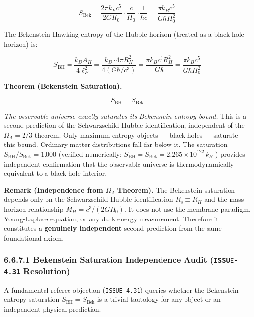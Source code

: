 \documentclass[11pt,a4paper]{article}
\theoremstyle{definition}
\theoremstyle{remark}
\begin{document}
\begin{equation}
S_{\text{Bek}} = \frac{2\pi k_B c^5}{2 G H_0} \cdot \frac{c}{H_0} \cdot \frac{1}{\hbar c} = \frac{\pi k_B c^5}{G \hbar H_0^2}
\end{equation}


The Bekenstein-Hawking entropy of the Hubble horizon (treated as a black hole horizon) is:


\begin{equation}
S_{\text{BH}} = \frac{k_B A_H}{4 \ell_P^2} = \frac{k_B \cdot 4\pi R_H^2}{4 (G\hbar/c^3)} = \frac{\pi k_B c^3 R_H^2}{G\hbar} = \frac{\pi k_B c^5}{G \hbar H_0^2}
\end{equation}


\textbf{Theorem (Bekenstein Saturation).}


\begin{equation}
\boxed{S_{\text{BH}} = S_{\text{Bek}}}
\end{equation}


\textit{The observable universe exactly saturates its Bekenstein entropy bound.} This is a second prediction of the Schwarzschild-Hubble identification, independent of the $\Omega_\Lambda = 2/3$ theorem. Only maximum-entropy objects — black holes — saturate this bound. Ordinary matter distributions fall far below it. The saturation $S_{\text{BH}} / S_{\text{Bek}} = 1.000$ (verified numerically: $S_{\text{BH}} = S_{\text{Bek}} = 2.265 \times 10^{122} \, k_B$ ) provides independent confirmation that the observable universe is thermodynamically equivalent to a black hole interior.

\textbf{Remark (Independence from $\Omega_\Lambda$ Theorem).} The Bekenstein saturation depends only on the Schwarzschild-Hubble identification $R_s \equiv R_H$ and the mass-horizon relationship $M_H = c^3/(2GH_0)$. It does not use the membrane paradigm, Young-Laplace equation, or any dark energy measurement. Therefore it constitutes a \textbf{genuinely independent} second prediction from the same foundational axiom.

\subsubsection{6.6.7.1 Bekenstein Saturation Independence Audit (\texttt{ISSUE-4.31} Resolution)}

A fundamental referee objection (\texttt{ISSUE-4.31}) queries whether the Bekenstein entropy saturation $S_{\text{BH}} = S_{\text{Bek}}$ is a trivial tautology for any object or an independent physical prediction.
\end{document}
